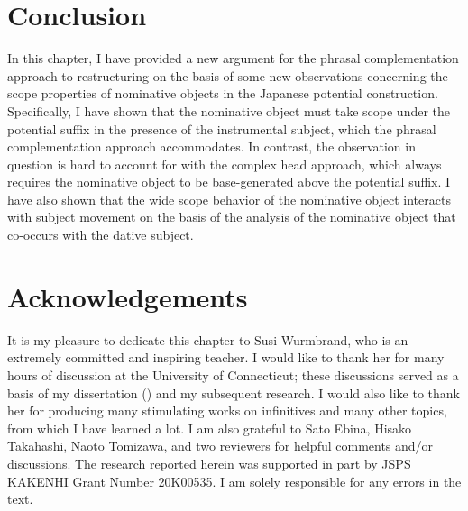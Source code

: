\documentclass[output=paper]{langscibook}
\begin{document}
\section{Conclusion}\label{takahas6}
In this chapter, I have provided a new argument for the phrasal complementation approach to restructuring on the basis of some new observations concerning the scope properties of nominative objects in the Japanese potential construction. Specifically, I have shown that the nominative object must take scope under the potential suffix in the presence of the instrumental subject, which the phrasal complementation approach accommodates. In contrast, the observation in question is hard to account for with the complex head approach, which always requires the nominative object to be base-generated above the potential suffix. I have also shown that the wide scope behavior of the nominative object interacts with subject movement on the basis of the analysis of the nominative object that co-occurs with the dative subject.



\begin{comment}
\newpage
\section*{Abbreviations}
\begin{tabularx}{.45\textwidth}{lQ}
... & \\
... & \\
\end{tabularx}
\begin{tabularx}{.45\textwidth}{lQ}
... & \\
... & \\
\end{tabularx}
\end{comment}

\section*{Acknowledgements}
It is my pleasure to dedicate this chapter to Susi Wurmbrand, who is an extremely committed and inspiring teacher. I would like to thank her for many hours of discussion at the University of Connecticut; these discussions served as a basis of my dissertation (\citealt{takahashi2011}) and my subsequent research. I would also like to thank her for producing many stimulating works on infinitives and many other topics, from which I have learned a lot. I am also grateful to Sato Ebina, Hisako Takahashi, Naoto Tomizawa, and two reviewers for helpful comments and/or discussions. The research reported herein was supported in part by JSPS KAKENHI Grant Number 20K00535. I am solely responsible for any errors in the text.



\sloppy \printbibliography[heading=subbibliography,notkeyword=this]
\end{document}
